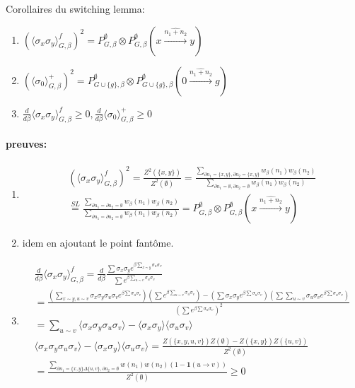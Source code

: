 \documentclass[a4paper,12pt]{report}
\begin{document}
Corollaires du switching lemma:
\begin{enumerate}
\item $(\langle \sigma_x \sigma_y \rangle_{G,\beta}^f)^2 = P_{G,\beta}^\emptyset \otimes P_{G,\beta}^\emptyset (x\overset{\widehat{n_1+n_2}}{\longrightarrow} y)$
\item $(\langle \sigma_0\rangle_{G,\beta}^+)^2= P_{G\cup\{g\},\beta}^\emptyset \otimes P_{G\cup\{g\},\beta}^\emptyset (0\overset{\widehat{n_1+n_2}}{\longrightarrow} g)$
\item $\displaystyle \frac{d}{d\beta}\langle \sigma_x \sigma_y \rangle_{G,\beta}^f \geqslant 0, \frac{d}{d\beta}\langle \sigma_0 \rangle_{G,\beta}^+ \geqslant 0$
\end{enumerate}

\paragraph{preuves:}
\begin{enumerate}
\item \begin{multline*}
(\langle \sigma_x \sigma_y \rangle_{G,\beta}^f)^2 = \frac{Z^2(\{x,y\})}{Z^2(\emptyset)} = \frac{\sum_{\partial n_1 = \{x,y\},\partial n_2 = \{x,y\}}w_\beta(n_1)w_\beta(n_2)}{\sum_{\partial n_1 = \emptyset,\partial n_2 = \emptyset}w_\beta(n_1)w_\beta(n_2)}\\ \overset{SL}{=} \frac{\sum_{\partial n_1 = \partial n_2 = \emptyset}w_\beta(n_1)w_\beta(n_2)}{\sum_{\partial n_1 = \partial n_2 = \emptyset}w_\beta(n_1)w_\beta(n_2)} = P_{G,\beta}^\emptyset \otimes P_{G,\beta}^\emptyset (x\overset{\widehat{n_1+n_2}}{\longrightarrow} y)
\end{multline*}
\item idem en ajoutant le point fantôme.
\item \begin{multline*}
\frac{d}{d\beta}\langle \sigma_x \sigma_y \rangle_{G,\beta}^f = \frac{d}{d\beta} \frac{\sum \sigma_x \sigma_y e^{\beta \sum_{x\sim y}\sigma_u \sigma_v}}{\sum e^{\beta\sum_{u\sim v}\sigma_u \sigma_v}} \\ = \frac{(\sum_{x\sim y,u\sim v}\sigma_x\sigma_y\sigma_u\sigma_v e^{\beta \sum \sigma_u\sigma_v})(\sum e^{\beta\sum_{u\sim v}\sigma_u \sigma_v}) - (\sum \sigma_x\sigma_y e^{\beta\sum\sigma_u\sigma_v})(\sum\sum_{u\sim v}\sigma_u\sigma_v e^{\beta \sum\sigma_u\sigma_v})}{(\sum e^{\beta \sum \sigma_u \sigma_v})^2} \\
= \sum_{u\sim v}\langle \sigma_x \sigma_y \sigma_u \sigma_v\rangle - \langle \sigma_x \sigma_y\rangle\langle \sigma_u \sigma_v \rangle \\
\langle \sigma_x \sigma_y \sigma_u \sigma_v\rangle - \langle \sigma_x \sigma_y\rangle\langle \sigma_u \sigma_v \rangle = \frac{Z(\{x,y,u,v\})Z(\emptyset) - Z(\{x,y\})Z(\{u,v\})}{Z^2(\emptyset)} \\ = \frac{\sum_{\partial n_1 = \{x,y\}\Delta\{u,v\},\partial n_2 = \emptyset}w(n_1)w(n_2)(1-\mathbf{1}(u\longrightarrow v))}{Z^2(\emptyset)}\geqslant 0
\end{multline*}
\end{enumerate}
\end{document}
